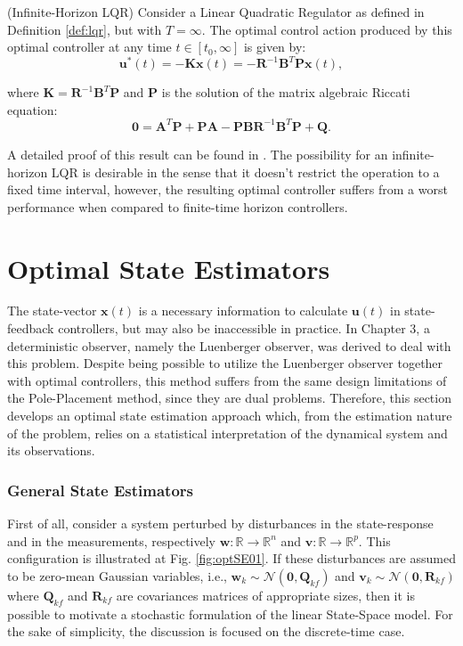 \documentclass[a4paper,11pt]{book}
\numberwithin{figure}{chapter}
\numberwithin{equation}{chapter}
\numberwithin{table}{chapter}
\newtheorem{theorem}{Theorem}[chapter]
\theoremstyle{definition}
\newcounter{boxed-theorem}
\newenvironment{boxed-theorem}[1]
{\colorlet{shadecolor}{pastelBlue2!5} \begin{shaded} \begin{theorem}{#1}}
{\end{theorem} \end{shaded}}
\newcounter{boxed-lemma}
\newcounter{boxed-definition}
\newcounter{boxed-example}
\begin{document}
\begin{boxed-theorem}{(Infinite-Horizon LQR)} \label{th:infiniteLQR}
    Consider a Linear Quadratic Regulator as defined in Definition \ref{def:lqr}, but with $T = \infty$. The optimal control action produced by this optimal controller at any time $t \in [t_0, \infty]$ is given by:
    \begin{equation}
        \bm{u}^*(t) = - \bm{K} \bm{x}(t) = - \bm{R}^{-1} \bm{B}^T \bm{P} \bm{x}(t)
    ,\end{equation}
    
    \noindent where $\bm{K} = \bm{R}^{-1} \bm{B}^T \bm{P}$ and $\bm{P}$ is the solution of the matrix algebraic Riccati equation:
    \begin{equation}
        \bm{0} = \bm{A}^T \bm{P} + \bm{P} \bm{A} - \bm{P} \bm{B} \bm{R}^{-1} \bm{B}^T \bm{P} + \bm{Q}
    .\end{equation}
\end{boxed-theorem}

A detailed proof of this result can be found in \cite{Moore:1990}. The possibility for an infinite-horizon LQR is desirable in the sense that it doesn't restrict the operation to a fixed time interval, however, the resulting optimal controller suffers from a worst performance when compared to finite-time horizon controllers.

\section{Optimal State Estimators}

The state-vector $\bm{x}(t)$ is a necessary information to calculate $\bm{u}(t)$ in state-feedback controllers, but may also be inaccessible in practice. In Chapter 3, a deterministic observer, namely the Luenberger observer, was derived to deal with this problem. Despite being possible to utilize the Luenberger observer together with optimal controllers, this method suffers from the same design limitations of the Pole-Placement method, since they are dual problems. Therefore, this section develops an optimal state estimation approach which, from the estimation nature of the problem, relies on a statistical interpretation of the dynamical system and its observations. 

\subsubsection{General State Estimators}

First of all, consider a system perturbed by disturbances in the state-response and in the measurements, respectively $\bm{w} : \mathbb{R} \rightarrow \mathbb{R}^{n}$ and $\bm{v} : \mathbb{R} \rightarrow \mathbb{R}^{p}$. This configuration is illustrated at Fig. \ref{fig:optSE01}. If these disturbances are assumed to be zero-mean Gaussian variables, i.e., $\bm{w}_k \sim \mathcal{N}(\bm{0}, \bm{Q}_{kf})$ and $\bm{v}_k \sim \mathcal{N}(\bm{0}, \bm{R}_{kf})$ where $\bm{Q}_{kf}$ and $\bm{R}_{kf}$ are covariances matrices of appropriate sizes, then it is possible to motivate a stochastic formulation of the linear State-Space model. For the sake of simplicity, the discussion is focused on the discrete-time case. 
\end{document}
